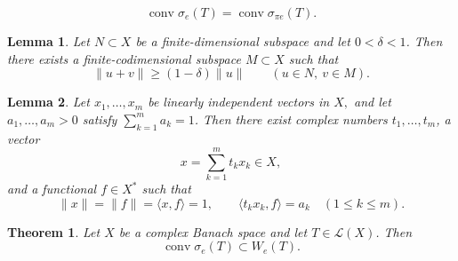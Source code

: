 \documentclass[10pt,a4paper]{amsart}
\newtheorem{theorem}{Theorem}
\newtheorem{lemma}{Lemma}
\newcommand{\We}{W_e}
\DeclareMathOperator{\conv}{conv}
\newcommand{\ip}[2]{\langle #1,#2\rangle}
\begin{document}
\begin{equation}\label{eq:conv-sigmae-sigmapie}
        \operatorname{conv}\sigma_e(T)
        =
        \operatorname{conv}\sigma_{\pi e}(T).
\end{equation}

\begin{lemma}\label{lem:separation-finite-codim}
Let $N\subset X$ be a finite-dimensional subspace and let $0<\delta<1$. Then there exists a finite-codimensional subspace $M\subset X$ such that
\[
\|u+v\|\ge (1-\delta)\|u\|
\qquad (u\in N,\ v\in M).
\]
\end{lemma}

\begin{lemma}\label{lem:zenger}
Let $x_1,\dots,x_m$ be linearly independent vectors in $X,$
and let $a_1,\dots,a_m>0$ satisfy $\sum_{k=1}^m a_k=1$. Then there exist complex numbers $t_1,\dots,t_m$, a vector
\[
x=\sum_{k=1}^m t_kx_k\in X,
\]
and a functional $f\in X^*$ such that
\[
\|x\|=\|f\|=\ip{x}{f}=1,
\qquad
\ip{t_kx_k}{f}=a_k
\quad (1\le k\le m).
\]
\end{lemma}

\begin{theorem}\label{thm:convhull-sigma-pie}
Let $X$ be a complex Banach space and let $T\in \mathcal L(X)$. Then
\[
\conv\sigma_{e}(T)\subset \We(T).
\]
\end{theorem}
\end{document}
